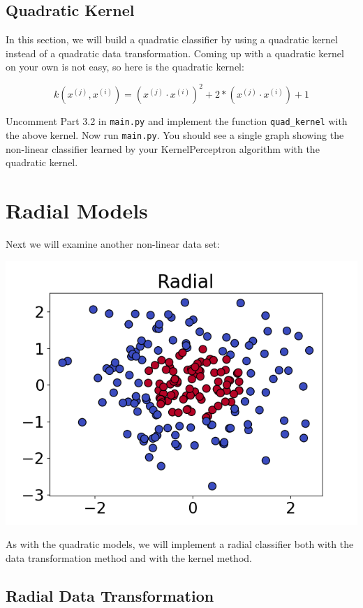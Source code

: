 \documentclass{article}
\begin{document}
\subsection{Quadratic Kernel}

In this section, we will build a quadratic classifier by using a quadratic kernel instead of a quadratic data transformation. Coming up with a quadratic kernel on your own is not easy, so here is the quadratic kernel:

$$k \left( x^{(j)}, x^{(i)} \right) = \left( x^{(j)} \cdot x^{(i)} \right)^2 + 2 * \left( x^{(j)} \cdot x^{(i)} \right) + 1$$

Uncomment Part 3.2 in \texttt{main.py} and implement the function \texttt{quad\_kernel} with the above kernel. Now run \texttt{main.py}. You should see a single graph showing the non-linear classifier learned by your KernelPerceptron algorithm with the quadratic kernel.

\section{Radial Models}

Next we will examine another non-linear data set:

\noindent
\includegraphics[width=\textwidth]{radial.png}

As with the quadratic models, we will implement a radial classifier both with the data transformation method and with the kernel method.

\subsection{Radial Data Transformation}
\end{document}
